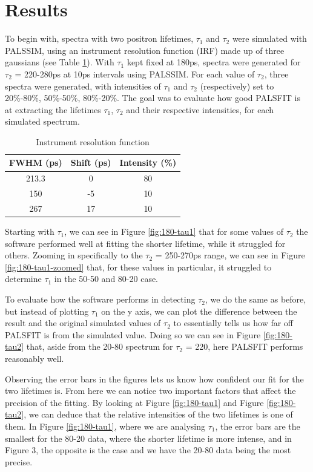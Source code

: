 \chapter*{Results}

To begin with, spectra with two positron lifetimes, $\tau_1$ and $\tau_2$ were simulated with PALSSIM, using an instrument resolution function (IRF) made up of three gaussians (see Table \ref{tab:irf}). With $\tau_1$ kept fixed at 180ps, spectra were generated for $\tau_2$  = 220-280ps at 10ps intervals using PALSSIM. For each value of $\tau_2$, three spectra were generated, with intensities of $\tau_1$ and $\tau_2$ (respectively) set to 20\%-80\%, 50\%-50\%, 80\%-20\%. The goal was to evaluate how good PALSFIT is at extracting the lifetimes $\tau_1$, $\tau_2$ and their respective intensities, for each simulated spectrum. 

\begin{table}[h]
    \centering
    \begin{tabular}{|c|c|c|}
        \hline
        FWHM (ps) &  Shift (ps) & Intensity (\%) \\
        \hline
        213.3 & 0 & 80\\ 
        150 & -5 & 10\\ 
        267 & 17 & 10\\  
        \hline
    \end{tabular}
    \caption{Instrument resolution function}
    \label{tab:irf}
\end{table}

Starting with $\tau_1$, we can see in Figure \ref{fig:180-tau1} that for some values of $\tau_2$ the software performed well at fitting the shorter lifetime, while it struggled for others. 
Zooming in specifically to the $\tau_2$ = 250-270ps range, we can see in Figure \ref{fig:180-tau1-zoomed} that, for these values in particular, it struggled to determine $\tau_1$ in the 50-50 and 80-20 case. 

To evaluate how the software performs in detecting $\tau_2$, we do the same as before, but instead of plotting $\tau_1$ on the y axis, we can plot the difference between the result and the original simulated values of $\tau_2$ to essentially tells us how far off PALSFIT is from the simulated value. Doing so we can see in Figure \ref{fig:180-tau2} that, aside from the 20-80 spectrum for $\tau_2$ = 220, here PALSFIT performs reasonably well.

Observing the error bars in the figures lets us know how confident our fit for the two lifetimes is. From here we can notice two important factors that affect the precision of the fitting. By looking at Figure \ref{fig:180-tau1} and Figure \ref{fig:180-tau2}, we can deduce that the relative intensities of the two lifetimes is one of them. In Figure \ref{fig:180-tau1}, where we are analysing $\tau_1$, the error bars are the smallest for the 80-20 data, where the shorter lifetime is more intense, and in Figure 3, the opposite is the case and we have the 20-80 data being the most precise.

